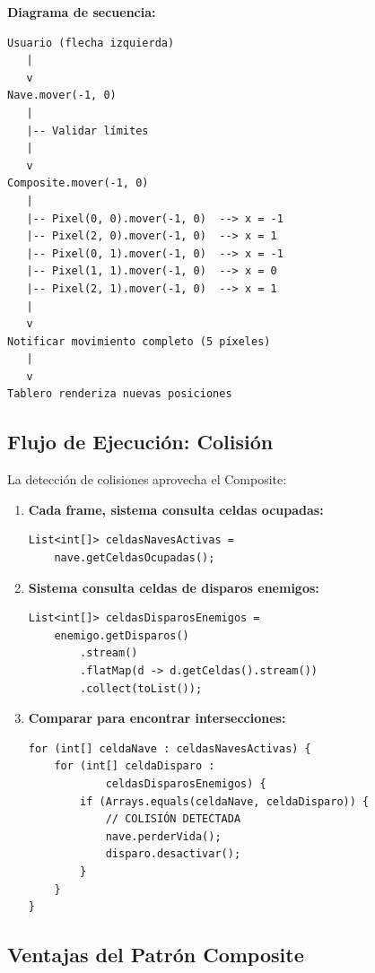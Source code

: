 \documentclass[12pt]{article}
\begin{document}
\textbf{Diagrama de secuencia:}

\begin{verbatim}
Usuario (flecha izquierda)
   |
   v
Nave.mover(-1, 0)
   |
   |-- Validar límites
   |
   v
Composite.mover(-1, 0)
   |
   |-- Pixel(0, 0).mover(-1, 0)  --> x = -1
   |-- Pixel(2, 0).mover(-1, 0)  --> x = 1
   |-- Pixel(0, 1).mover(-1, 0)  --> x = -1
   |-- Pixel(1, 1).mover(-1, 0)  --> x = 0
   |-- Pixel(2, 1).mover(-1, 0)  --> x = 1
   |
   v
Notificar movimiento completo (5 píxeles)
   |
   v
Tablero renderiza nuevas posiciones
\end{verbatim}

\subsection{Flujo de Ejecución: Colisión}

La detección de colisiones aprovecha el Composite:

\begin{enumerate}
    \item \textbf{Cada frame, sistema consulta celdas ocupadas:}
    \begin{lstlisting}
List<int[]> celdasNavesActivas = 
    nave.getCeldasOcupadas();
    \end{lstlisting}
    
    \item \textbf{Sistema consulta celdas de disparos enemigos:}
    \begin{lstlisting}
List<int[]> celdasDisparosEnemigos = 
    enemigo.getDisparos()
        .stream()
        .flatMap(d -> d.getCeldas().stream())
        .collect(toList());
    \end{lstlisting}
    
    \item \textbf{Comparar para encontrar intersecciones:}
    \begin{lstlisting}
for (int[] celdaNave : celdasNavesActivas) {
    for (int[] celdaDisparo : 
            celdasDisparosEnemigos) {
        if (Arrays.equals(celdaNave, celdaDisparo)) {
            // COLISIÓN DETECTADA
            nave.perderVida();
            disparo.desactivar();
        }
    }
}
    \end{lstlisting}
\end{enumerate}

\subsection{Ventajas del Patrón Composite}
\end{document}
